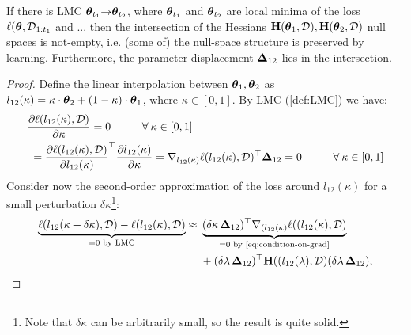 \documentclass{article} %
\newcommand{\hessian}{\vH}
\begin{document}


\begin{thm}
\label{theo:preservation-of-null space}
If there is LMC  $\mbox{$\mbox{$\boldsymbol{\theta}$}$}_{t_1} \mbox{$\rightarrow$} \mbox{$\mbox{$\boldsymbol{\theta}$}$}_{t_2}$, where $\mbox{$\mbox{$\boldsymbol{\theta}$}$}_{t_1}$ and $\mbox{$\mbox{$\boldsymbol{\theta}$}$}_{t_2}$ are local minima of the loss $\ell(\mbox{$\mbox{$\boldsymbol{\theta}$}$}, \mbox{${\cal D}$}_{1:t_1}$ and ... 
then the intersection  of the Hessians $\hessian(\vparam_{1}, \data), \hessian(\vparam_{2}, \data)$ null spaces is not-empty, i.e. (some of) the null-space structure is preserved by learning. Furthermore, the parameter displacement $\mbox{$\mbox{$\boldsymbol{\Delta}$}$}_{12}$ lies in the intersection.
\end{thm}


\begin{proof}
Define the linear interpolation between $\mbox{$\mbox{$\boldsymbol{\theta}$}$}_1, \mbox{$\mbox{$\boldsymbol{\theta}$}$}_2$ as $l_{12}(\kappa) = \kappa\cdot \mbox{$\mbox{$\boldsymbol{\theta}$}$}_2 + (1-\kappa)\cdot \mbox{$\mbox{$\boldsymbol{\theta}$}$}_1$, where $\kappa \in [0,1]$. 
By LMC (\cref{def:LMC}) we have:
\begin{align}
    &\frac{\partial{\ell(l_{12}(\kappa), \mbox{${\cal D}$})}}{\partial{\kappa}} = 0 \hspace{1cm}\forall \:\kappa \in [0,1]\\
    \label{eq:condition-on-grad}
    & \hspace{3pt} = \frac{\partial{\ell(l_{12}(\kappa), \mbox{${\cal D}$})}}{\partial{l_{12}(\kappa)}}^\top \frac{\partial{l_{12}(\kappa)}}{\partial{\kappa}} = \nabla_{l_{12}(\kappa)}\ell(l_{12}(\kappa), \mbox{${\cal D}$}) ^\top \mbox{$\mbox{$\boldsymbol{\Delta}$}$}_{12} = 0 \hspace{1cm}\forall \:\kappa \in [0,1]
\end{align}
Consider now the second-order approximation of the loss around $l_{12}(\kappa)$ for a small perturbation $\delta\kappa$\footnote{Note that $\delta\kappa$ can be arbitrarily small, so the result is quite solid.}: 
\begin{align}
    \underbrace{\loss(l_{12}(\kappa + \delta\kappa), \data) - \loss(l_{12}(\kappa), \data)}_{=0 \text{ by LMC}} \approx  
    & \hspace{3pt} \underbrace{(\delta\kappa\,\vDelta_{12})^\top\grad_{(l_{12}(\kappa)}\loss((l_{12}(\kappa), \data)}_{=0 \text{ by \cref{eq:condition-on-grad}}} \\
    & \hspace{3pt}+ (\delta\lambda\,\vDelta_{12})^\top\hessian((l_{12}(\lambda), \data)(\delta\lambda\,\vDelta_{12}),

\end{align}
\end{proof}
\end{document}
